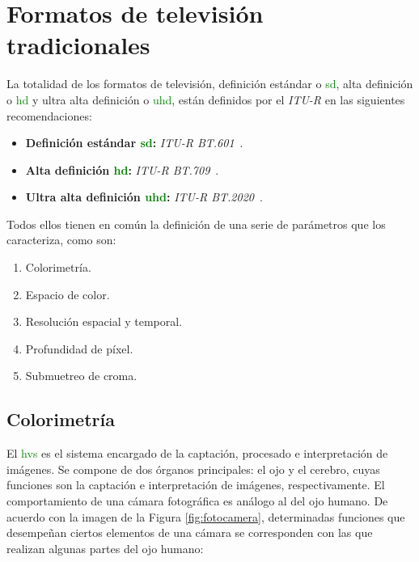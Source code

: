 \documentclass[a4paper, 12pt]{report}
\begin{document}
\section{Formatos de televisión tradicionales}
\label{sec:formatos_tv}
La totalidad de los formatos de televisión, definición estándar o \textcolor{green}{sd}, alta definición o \textcolor{green}{hd} y ultra alta definición o \textcolor{green}{uhd}, están definidos por el \textit{ITU-R} en las siguientes recomendaciones:

\begin{itemize}
    \item \textbf{Definición estándar \textcolor{green}{sd}:} \textit{ITU-R BT.601}~\cite{itu_r:_bt601}.
    \item \textbf{Alta definición \textcolor{green}{hd}:} \textit{ITU-R BT.709}~\cite{itu_r:_bt709}.
    \item \textbf{Ultra alta definición \textcolor{green}{uhd}:} \textit{ITU-R BT.2020}~\cite{itu_r:_bt2020}.
\end{itemize}

Todos ellos tienen en común la definición de una serie de parámetros que los caracteriza, como son:

\begin{enumerate}[1]
    \item Colorimetría.
    \item Espacio de color.
    \item Resolución espacial y temporal.
    \item Profundidad de píxel.
    \item Submuetreo de croma.
\end{enumerate}

\subsection{Colorimetría}
\label{subsec:colorimetria_tv_trad}

El \textcolor{green}{hvs} es el sistema encargado de la captación, procesado e interpretación de imágenes. Se compone de dos órganos principales: el ojo y el cerebro, cuyas funciones son la captación e interpretación de imágenes, respectivamente.
El comportamiento de una cámara fotográfica es análogo al del ojo humano. De acuerdo con la imagen de la Figura \ref{fig:fotocamera}, determinadas funciones que desempeñan ciertos elementos de una cámara se corresponden con las que realizan algunas partes del ojo humano:
\end{document}
